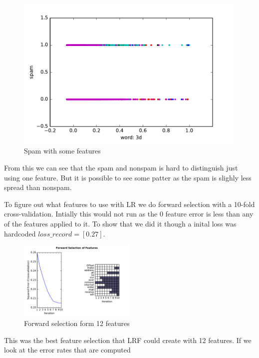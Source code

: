 \documentclass[10pt, paper=a4]{article}
\begin{document}
\begin{figure}[h]
\begin{minipage}{0.3\textwidth}
    \includegraphics[width = 0.99\textwidth]{../../src/img/3d_spam.pdf}
  \end{minipage} \vfill
  \caption{Spam with some features}
  \label{fig:modelcheck}
\end{figure}

From this we can see that the spam and nonspam is hard to distinguish
just using one feature. But it is possible to see some patter as the
spam is slighly less spread than nonspam.

To figure out what features to use with LR we do forward selection
with a 10-fold cross-validation. Intially this would not run as the 0
feature error is less than any of the features applied to it. To show
that we did it though a inital loss was hardcoded
$loss\_record=[0.27]$.

\begin{figure}[h]
  \centering
  \includegraphics[width = 0.5\textwidth]{../../src/img/best_forward_selection.pdf}
  \caption{Forward selection form 12 features}
  \label{fig:gam}
\end{figure}

This was the best feature selection that LRF could create with 12
features.  If we look at the error rates that are
computed
\end{document}

